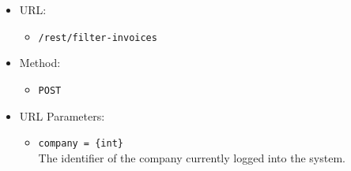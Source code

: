 \begin{itemize}
    
    \item URL: 
    \begin{itemize}
        \item \texttt{/rest/filter-invoices}
    \end{itemize}
    
    \item Method: 
    \begin{itemize}
        \item \texttt{POST}
    \end{itemize}
    
    \item URL Parameters: 
    \begin{itemize}
        \item \texttt{company = \{int\}} \\
        The identifier of the company currently logged into the system.
    \end{itemize}


\end{itemize}
